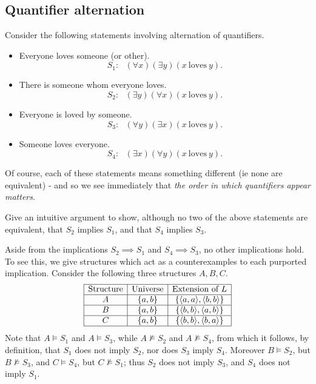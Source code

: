 

\subsection*{Quantifier alternation}
Consider the following statements involving alternation of quantifiers.
\begin{itemize}
\item
Everyone loves someone (or other).
\[S_1:\ \ \ (\forall x)(\exists y)(x\ \mathrm{loves}\ y).\]
\item
There is someone whom everyone loves.
\[S_2:\ \ \ (\exists y)(\forall x)(x\ \mathrm{loves}\ y).\]
\item
Everyone is loved by someone.
\[S_3:\ \ \ (\forall y)(\exists x)(x\ \mathrm{loves}\ y).\]
\item
Someone loves everyone.
\[S_4:\ \ \ (\exists x)(\forall y)(x\ \mathrm{loves}\ y).\]
\end{itemize}
Of course, each of these statements means something different (ie none are equivalent) - and so we see immediately that \emph{the order in which quantifiers appear matters}. 

\begin{aside}
    Give an intuitive argument to show, although no two of the above statements are equivalent, that $S_2$ implies $S_1$, and that $S_4$ implies $S_3$. 
\end{aside}

Aside from the implications $S_2 \implies S_1$ and $S_4 \implies S_3$, no other implications hold. To see this, we give structures which act as a counterexamples to each purported implication. Consider the following three structures $A, B, C$. 
\[
\begin{array}{| c | c | c |}
\hline
 \mbox{Structure}& \mbox{Universe} & \mbox{Extension of }L\\
  \hline            
  A & \{a,b\} & \{\mbox{$\langle a,a \rangle$},\mbox{$\langle b,b \rangle$}\}\\
  \hline
  B & \{a,b\} & \{\mbox{$\langle b,b \rangle$},\mbox{$\langle a,b \rangle$}\}\\
 \hline
 C & \{a,b\} & \{\mbox{$\langle b,b \rangle$},\mbox{$\langle b,a \rangle$}\}\\
 \hline  
\end{array}
\]
Note that $A\models S_1$ and $A\models S_3$, while $A\not\models S_2$ and $A\not\models S_4$, from which it follows, by definition, that $S_1$ does not imply $S_2$, nor does $S_3$ imply $S_4$. Moreover $B\models S_2$, but $B\not\models S_3$, and $C\models S_4$, but $C\not\models S_1$; thus $S_2$ does not imply $S_3$, and $S_4$ does not imply $S_1$. 


